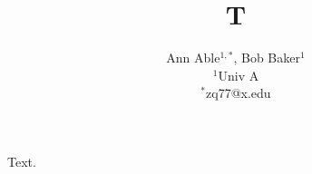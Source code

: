 \documentclass{article}
\title{T}
\author{Ann Able$^{1,*}$, Bob Baker$^{1}$ \\ $^1$Univ A \\ $^*$zq77@x.edu}
\begin{document}
\maketitle
Text.
\end{document}
